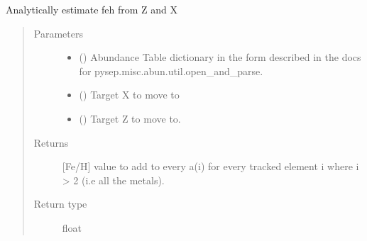 \documentclass[letterpaper,10pt,english]{sphinxmanual}
\begin{document}

\begin{fulllineitems}
\label{\detokenize{pyTOPSScrape.parse:pyTOPSScrape.parse.abundance.est_feh_from_Z_and_X}}
\sphinxAtStartPar
Analytically estimate feh from Z and X
\begin{quote}\begin{description}
\item[{Parameters}] \leavevmode\begin{itemize}
\item {} 
\sphinxAtStartPar
{} () \textendash{} Abundance Table dictionary in the form described in the docs for
pysep.misc.abun.util.open\_and\_parse.

\item {} 
\sphinxAtStartPar
{} () \textendash{} Target X to move to

\item {} 
\sphinxAtStartPar
{} () \textendash{} Target Z to move to.

\end{itemize}

\item[{Returns}] \leavevmode
\sphinxAtStartPar
{} \textendash{} {[}Fe/H{]} value to add to every a(i) for every tracked element i where
i \textgreater{} 2 (i.e all the metals).

\item[{Return type}] \leavevmode
\sphinxAtStartPar
float

\end{description}\end{quote}

\end{fulllineitems}

\end{document}
